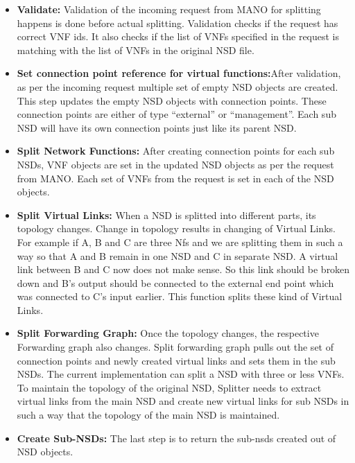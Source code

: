 \begin{itemize}
	\item \textbf{Validate: }Validation of the incoming request from MANO for splitting happens is done before actual splitting. Validation checks if the request has correct VNF ids. It also checks if the list of VNFs specified in the request is matching with the list of VNFs in the original NSD file.
	\item \textbf{Set connection point reference for virtual functions:}After validation, as per the incoming request multiple set of empty NSD objects are created. This step updates the empty NSD objects with connection points. These connection points are either of type “external” or “management”. Each sub NSD will have its own connection points just like its parent NSD.
	\item \textbf{Split Network Functions: }After creating connection points for each sub NSDs, VNF objects are set in the updated NSD objects as per the request from MANO. Each set of VNFs from the request is set in each of the NSD objects. 
	\item \textbf{Split Virtual Links: }When a NSD is splitted into different parts, its topology changes. Change in topology results in changing of Virtual Links. For example if A, B and C are three Nfs and we are splitting them in such a way so that A and B remain in one NSD and C in separate NSD. A virtual link between B and C now does not make sense. So this link should be broken down and B’s output should be connected to the external end point which was connected to C’s input earlier. This function splits these kind of Virtual Links.
	\item \textbf{Split Forwarding Graph: }Once the topology changes, the respective Forwarding graph also changes. Split forwarding graph pulls out the set of connection points and newly created virtual links and sets them in the sub NSDs. The current implementation can split a NSD with three or less VNFs. To maintain the topology of the original NSD, Splitter needs to extract virtual links from the main NSD and create new virtual links for sub NSDs in such a way that the topology of the main NSD is maintained. 
	\item \textbf{Create Sub-NSDs: } The last step is to return the sub-nsds created out of NSD objects.
\end{itemize} 


